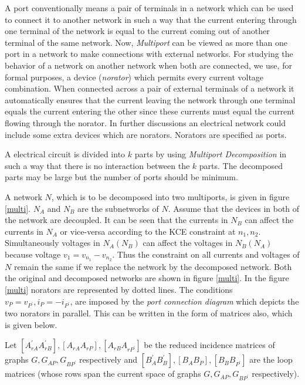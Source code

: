 \documentclass[10pt,psfig,letterpaper,twocolumn]{article}
\begin{document}
A port conventionally means a pair of terminals in a network which can be used to connect it to another network in such a way 
that the current entering through one terminal of the network is equal to the current coming out of 
another terminal of the same network. Now, {\it Multiport} can be viewed as more than one port in a network 
to make connections with external networks. For studying the behavior of a network on another network when both are
connected, we use, for formal purposes, a device ({\it norator}) which permits every current voltage combination. When connected across
a pair of external terminals of a network it automatically 
ensures that the current leaving the network through one terminal equals the current entering the other since these currents must equal
the current flowing through the norator. In further discussions an electrical 
network could include some extra devices which are  norators. Norators are specified as ports. \par

A electrical circuit is divided into $k$ parts by using {\it Multiport Decomposition} \cite{HN} in such a way that there is no 
interaction between the $k$ parts. The decomposed parts may be large but the number of ports should be minimum. \par
A network $N$, which is to be decomposed into two multiports, is given in figure \ref{multi}. $N_{A}$ and $N_{B}$ are the 
subnetworks of $N$. Assume that the devices in both of the network are decoupled.
It can be seen that the currents in $N_{B}$ can affect the currents in $N_{A}$ or vice-versa
according to the KCE constraint at $n_{1},n_{2}$. Simultaneously voltages in $N_{A}(N_{B})$ can affect the
voltages in $N_{B}(N_{A})$ because voltage $v_{1} = v_{n_{1}} - v_{n_{2}}$. Thus the constraint on
all currents and voltages of $N$ remain the same if we replace the network by the decomposed network. Both 
the original and decomposed networks are shown in figure \ref{multi}. In the figure \ref{multi} norators are 
represented by dotted lines. The conditions $v_{P} = v_{P^{'}}, i_{P} = -i_{P^{'}}$, are imposed by the 
{\it port connection diagram} which depicts the two norators in parallel. This can be written in the form 
of matrices also, which is given below.\par 

\hspace{1in}Let $[A_{rA}^{'} A_{rB}^{'}], [A_{rA} A_{rP}], [A_{rB} A_{rP^{'}}]$
be the reduced incidence matrices of graphs $G, G_{AP}, G_{BP^{'}}$ respectively and $[B_{A}^{'}
B_{B}^{'}], [B_{A} B_{P}], [B_{B} B_{P^{'}}]$ are the loop matrices (whose rows span the current space
of graphs $G, G_{AP}, G_{BP^{'}}$ respectively).
\end{document}
